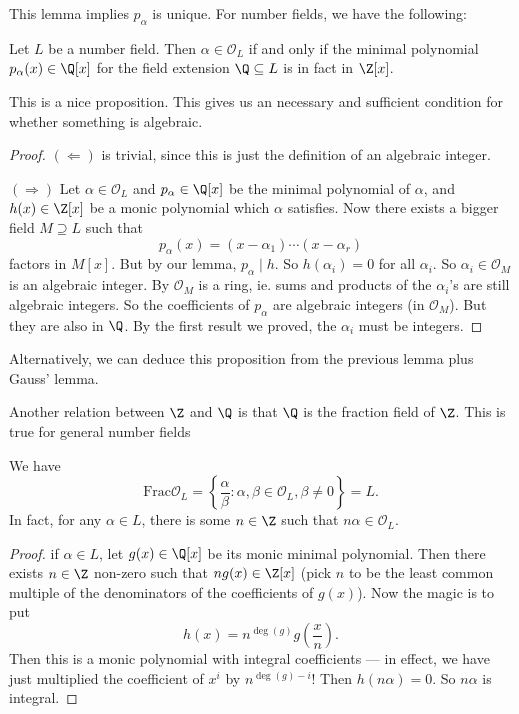 \documentclass[a4paper]{article}
\begin{document}
This lemma implies $p_\alpha$ is unique. For number fields, we have the following:
\begin{prop}
  Let $L$ be a number field. Then $\alpha \in \mathcal{O}_L$ if and only if the minimal polynomial $p_\alpha(x) \in \Q[x]$ for the field extension $\Q \subseteq L$ is in fact in $\Z[x]$.
\end{prop}
This is a nice proposition. This gives us an necessary and sufficient condition for whether something is algebraic.
\begin{proof}
  $(\Leftarrow)$ is trivial, since this is just the definition of an algebraic integer.

  $(\Rightarrow)$ Let $\alpha \in \mathcal{O}_L$ and $p_\alpha \in \Q[x]$ be the minimal polynomial of $\alpha$, and $h(x) \in \Z[x]$ be a monic polynomial which $\alpha$ satisfies. Now there exists a bigger field $M \supseteq L$ such that
  \[
    p_\alpha(x) = (x - \alpha_1) \cdots (x - \alpha_r)
  \]
  factors in $M[x]$. But by our lemma, $p_\alpha \mid h$. So $h(\alpha_i) = 0$ for all $\alpha_i$. So $\alpha_i \in \mathcal{O}_M$ is an algebraic integer. By $\mathcal{O}_M$ is a ring, ie. sums and products of the $\alpha_i$'s are still algebraic integers. So the coefficients of $p_\alpha$ are algebraic integers (in $\mathcal{O}_M$). But they are also in $\Q$. By the first result we proved, the $\alpha_i$ must be integers.
\end{proof}
Alternatively, we can deduce this proposition from the previous lemma plus Gauss' lemma.

Another relation between $\Z$ and $\Q$ is that $\Q$ is the fraction field of $\Z$. This is true for general number fields
\begin{lemma}
  We have
  \[
    \mathrm{Frac} \mathcal{O}_L = \left\{\frac{\alpha}{\beta}: \alpha, \beta \in \mathcal{O}_L, \beta \not= 0\right\} = L.
  \]
  In fact, for any $\alpha \in L$, there is some $n \in \Z$ such that $n\alpha \in \mathcal{O}_L$.
\end{lemma}

\begin{proof}
  if $\alpha \in L$, let $g(x) \in \Q[x]$ be its monic minimal polynomial. Then there exists $n \in \Z$ non-zero such that $ng(x) \in \Z[x]$ (pick $n$ to be the least common multiple of the denominators of the coefficients of $g(x)$). Now the magic is to put
  \[
    h(x) = n^{\deg(g)}g\left(\frac{x}{n}\right).
  \]
  Then this is a monic polynomial with integral coefficients --- in effect, we have just multiplied the coefficient of $x^i$ by $n^{\deg(g) - i}$! Then $h(n\alpha) = 0$. So $n\alpha$ is integral.
\end{proof}
\end{document}

